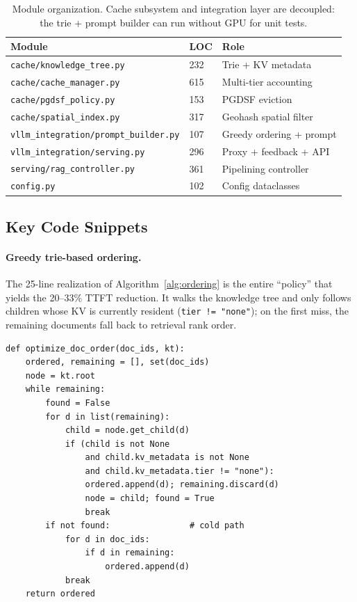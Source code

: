 \documentclass{article}
\begin{document}
\begin{table}[h]
\caption{Module organization. Cache subsystem and integration layer are decoupled: the trie + prompt builder can run without GPU for unit tests.}
\label{tab:modules}
\centering
\scriptsize
\begin{tabular}{@{}lll@{}}
\toprule
\textbf{Module} & \textbf{LOC} & \textbf{Role} \\
\midrule
\texttt{cache/knowledge\_tree.py}      & 232 & Trie + KV metadata \\
\texttt{cache/cache\_manager.py}       & 615 & Multi-tier accounting \\
\texttt{cache/pgdsf\_policy.py}        & 153 & PGDSF eviction \\
\texttt{cache/spatial\_index.py}       & 317 & Geohash spatial filter \\
\texttt{vllm\_integration/prompt\_builder.py} & 107 & Greedy ordering + prompt \\
\texttt{vllm\_integration/serving.py}  & 296 & Proxy + feedback + API \\
\texttt{serving/rag\_controller.py}    & 361 & Pipelining controller \\
\texttt{config.py}                     & 102 & Config dataclasses \\
\bottomrule
\end{tabular}
\vspace{-0.5em}
\end{table}

\subsection{Key Code Snippets}

\paragraph{Greedy trie-based ordering.} The 25-line realization of Algorithm~\ref{alg:ordering} is the entire ``policy'' that yields the 20--33\% TTFT reduction. It walks the knowledge tree and only follows children whose KV is currently resident (\texttt{tier != "none"}); on the first miss, the remaining documents fall back to retrieval rank order.

\begin{lstlisting}[caption={Greedy ordering (\texttt{prompt\_builder.py}).},label={lst:order}]
def optimize_doc_order(doc_ids, kt):
    ordered, remaining = [], set(doc_ids)
    node = kt.root
    while remaining:
        found = False
        for d in list(remaining):
            child = node.get_child(d)
            if (child is not None
                and child.kv_metadata is not None
                and child.kv_metadata.tier != "none"):
                ordered.append(d); remaining.discard(d)
                node = child; found = True
                break
        if not found:                # cold path
            for d in doc_ids:
                if d in remaining:
                    ordered.append(d)
            break
    return ordered
\end{lstlisting}
\end{document}
